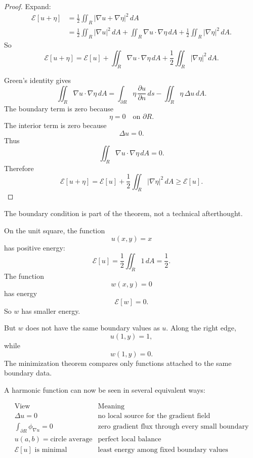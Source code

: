 \begin{proof}
Expand:
\[
\begin{aligned}
\mathcal E[u+\eta]
&=
\frac12\iint_R|\nabla u+\nabla\eta|^2\,dA\\
&=
\frac12\iint_R|\nabla u|^2\,dA
+
\iint_R\nabla u\cdot\nabla\eta\,dA
+
\frac12\iint_R|\nabla\eta|^2\,dA.
\end{aligned}
\]
So
\[
    \mathcal E[u+\eta]
    =
    \mathcal E[u]
    +
    \iint_R\nabla u\cdot\nabla\eta\,dA
    +
    \frac12\iint_R|\nabla\eta|^2\,dA.
\]

Green's identity gives
\[
    \iint_R\nabla u\cdot\nabla\eta\,dA
    =
    \int_{\partial R}\eta\,\frac{\partial u}{\partial n}\,ds
    -
    \iint_R\eta\,\Delta u\,dA.
\]
The boundary term is zero because
\[
    \eta=0
    \quad\text{on }\partial R.
\]
The interior term is zero because
\[
    \Delta u=0.
\]
Thus
\[
    \iint_R\nabla u\cdot\nabla\eta\,dA=0.
\]
Therefore
\[
    \mathcal E[u+\eta]
    =
    \mathcal E[u]
    +
    \frac12\iint_R|\nabla\eta|^2\,dA
    \ge
    \mathcal E[u].
\]
\end{proof}

The boundary condition is part of the theorem, not a technical afterthought.

\begin{example}
On the unit square, the function
\[
    u(x,y)=x
\]
has positive energy:
\[
    \mathcal E[u]=\frac12\iint_R 1\,dA=\frac12.
\]
The function
\[
    w(x,y)=0
\]
has energy
\[
    \mathcal E[w]=0.
\]
So \(w\) has smaller energy.

But \(w\) does not have the same boundary values as \(u\).  Along the right edge,
\[
    u(1,y)=1,
\]
while
\[
    w(1,y)=0.
\]
The minimization theorem compares only functions attached to the same boundary
data.
\end{example}

A harmonic function can now be seen in several equivalent ways:

\[
\begin{array}{c|l}
\text{View} & \text{Meaning} \\ \hline
\Delta u=0 & \text{no local source for the gradient field}\\[1mm]
\displaystyle \int_{\partial R}\phi_{\nabla u}=0
& \text{zero gradient flux through every small boundary}\\[3mm]
u(a,b)=\text{circle average} & \text{perfect local balance}\\[1mm]
\mathcal E[u]\text{ is minimal} & \text{least energy among fixed boundary values}
\end{array}
\]

